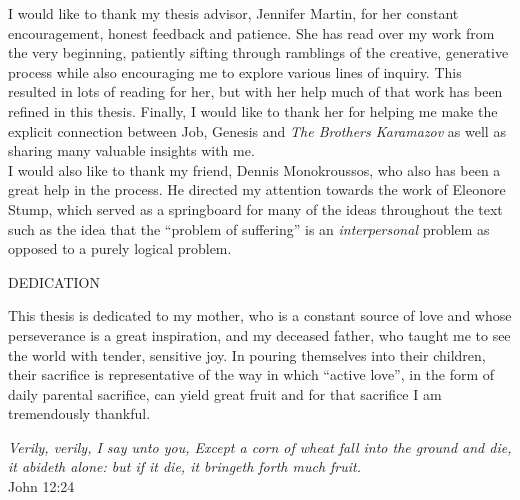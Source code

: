 I would like to thank my thesis advisor, Jennifer Martin, for her constant encouragement, honest feedback and patience. She has read over my work from the very beginning, patiently sifting through ramblings of the creative, generative process while also encouraging me to explore various lines of inquiry. This resulted in lots of reading for her, but with her help much of that work has been refined in this thesis. Finally, I would like to thank her for helping me make the explicit connection between Job, Genesis and \emph{The Brothers Karamazov} as well as sharing many valuable insights with me.\\

I would also like to thank my friend, Dennis Monokroussos, who also has been a great help in the process. He directed my attention towards the work of Eleonore Stump, which served as a springboard for many of the ideas throughout the text such as the idea that the ``problem of suffering'' is an \emph{interpersonal} problem as opposed to a purely logical problem. \\

\pagebreak

\centerline{DEDICATION}

This thesis is dedicated to my mother, who is a constant source of love and whose perseverance is a great inspiration, and my deceased father, who taught me to see the world with tender, sensitive joy. In pouring themselves into their children, their sacrifice is representative of the way in which ``active love'', in the form of daily parental sacrifice, can yield great fruit and for that sacrifice I am tremendously thankful. \\

\begin{center}
{\emph{Verily, verily, I say unto you, Except a corn of wheat fall into the ground and die, it abideth alone: but if it die, it bringeth forth much fruit.} \\ John 12:24}
\end{center}

